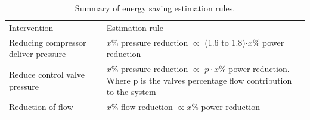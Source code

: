 \begin{table}[h]
	\centering
	\begin{tabular}{p{}p{}p{}}
		\hline
		Intervention && Estimation rule\\
		\hhline{===} 
		Reducing compressor deliver pressure & & $x \%$ pressure reduction  $\propto$ (1.6 to 1.8)$\cdot x\%$ power reduction \newline \\
		Reduce control valve pressure &  &$x \%$ pressure reduction $\propto$  $p\cdot x\%$ power reduction. \newline \newline Where p is the valves percentage flow contribution to the system \newline \\
		Reduction of flow && $x \%$ flow reduction  $\propto x \%$ power reduction \newline\\
		\hline
	\end{tabular} 
	\caption[Summary of energy saving estimation rules]{Summary of energy saving estimation rules\cite{Marais2012PhD}.}
	\label{table: Rules of thumb}
\end{table}

